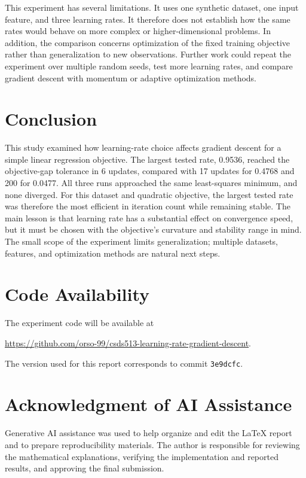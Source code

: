 \documentclass[11pt,onecolumn]{article}
\begin{document}
This experiment has several limitations. It uses one synthetic dataset, one input feature, and three learning rates. It therefore does not establish how the same rates would behave on more complex or higher-dimensional problems. In addition, the comparison concerns optimization of the fixed training objective rather than generalization to new observations. Further work could repeat the experiment over multiple random seeds, test more learning rates, and compare gradient descent with momentum or adaptive optimization methods.

\section{Conclusion}
This study examined how learning-rate choice affects gradient descent for a simple linear regression objective. The largest tested rate, 0.9536, reached the objective-gap tolerance in 6 updates, compared with 17 updates for 0.4768 and 200 for 0.0477. All three runs approached the same least-squares minimum, and none diverged. For this dataset and quadratic objective, the largest tested rate was therefore the most efficient in iteration count while remaining stable. The main lesson is that learning rate has a substantial effect on convergence speed, but it must be chosen with the objective's curvature and stability range in mind. The small scope of the experiment limits generalization; multiple datasets, features, and optimization methods are natural next steps.

\section*{Code Availability}
The experiment code will be available at

\url{https://github.com/orso-99/csds513-learning-rate-gradient-descent}. 

\noindent The version used for this report corresponds to commit
\texttt{3e9dcfc}.

\section*{Acknowledgment of AI Assistance}
Generative AI assistance was used to help organize and edit the LaTeX report and to prepare reproducibility materials. The author is responsible for reviewing the mathematical explanations, verifying the implementation and reported results, and approving the final submission.
\end{document}
